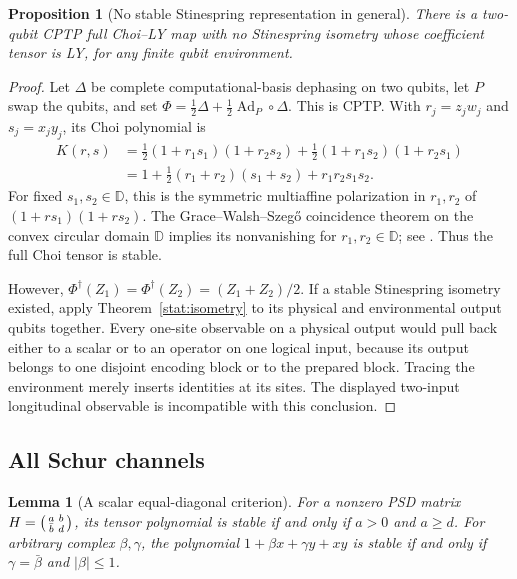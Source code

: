 \documentclass[reqno]{amsart}
\newtheorem{proposition}[theorem]{Proposition}
\newtheorem{lemma}[theorem]{Lemma}
\theoremstyle{definition}
\theoremstyle{remark}
\newcommand{\D}{\mathbb D}
\begin{document}
\begin{proposition}[No stable Stinespring representation in general]
\label{stat:no-dilation}
There is a two-qubit CPTP full Choi--LY map with no Stinespring
isometry whose coefficient tensor is LY, for any finite qubit
environment.
\end{proposition}

\begin{proof}
Let \(\Delta\) be complete computational-basis dephasing on two
qubits, let \(P\) swap the qubits, and set
\(\Phi=\tfrac12\Delta+\tfrac12\operatorname{Ad}_P\circ\Delta\).
This is CPTP.  With \(r_j=z_jw_j\) and \(s_j=x_jy_j\), its
Choi polynomial is
\begin{equation}
 \begin{split}
 K(r,s)&=\tfrac12(1+r_1s_1)(1+r_2s_2)
       +\tfrac12(1+r_1s_2)(1+r_2s_1)\\
 &=1+\tfrac12(r_1+r_2)(s_1+s_2)+r_1r_2s_1s_2.
 \end{split}
 \label{stat:symmetrized-kernel}
\end{equation}
For fixed \(s_1,s_2\in\D\), this is the symmetric multiaffine
polarization in \(r_1,r_2\) of
\((1+rs_1)(1+rs_2)\).  The Grace--Walsh--Szeg\H{o} coincidence
theorem on the convex circular domain \(\D\) implies its
nonvanishing for \(r_1,r_2\in\D\); see \cite{BB10II}.
Thus the full Choi tensor is stable.

However,
\(\Phi^\dagger(Z_1)=\Phi^\dagger(Z_2)=(Z_1+Z_2)/2\).
If a stable Stinespring isometry existed, apply
Theorem~\ref{stat:isometry} to its physical and environmental
output qubits together.  Every one-site observable on a physical
output would pull back either to a scalar or to an operator on
one logical input, because its output belongs to one disjoint
encoding block or to the prepared block.  Tracing the environment
merely inserts identities at its sites.  The displayed two-input
longitudinal observable is incompatible with this conclusion.
\end{proof}

\subsection{All Schur channels}

\begin{lemma}[A scalar equal-diagonal criterion]
\label{stat:two-by-two}
For a nonzero PSD matrix
\(H=\begin{psmallmatrix}a&b\\\bar b&d\end{psmallmatrix}\),
its tensor polynomial is stable if and only if \(a>0\) and
\(a\ge d\).  For arbitrary complex \(\beta,\gamma\), the
polynomial \(1+\beta x+\gamma y+xy\) is stable if and only if
\(\gamma=\bar\beta\) and \(|\beta|\le1\).
\end{lemma}
\end{document}
